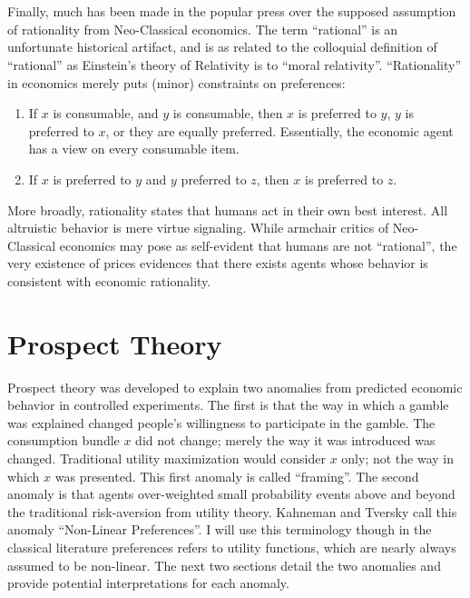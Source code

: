 \documentclass{article}
\theoremstyle{definition}
\begin{document}
\\
\\
Finally, much has been made in the popular press over the supposed assumption of rationality from Neo-Classical economics.  The term ``rational'' is an unfortunate historical artifact, and is as related to the colloquial definition of ``rational'' as Einstein's theory of Relativity is to ``moral relativity''.  ``Rationality'' in economics merely puts (minor) constraints on preferences: 
\begin{enumerate}
	\item If \(x\) is consumable, and \(y\) is consumable, then \(x\) is preferred to \(y\), \(y\) is preferred to \(x\), or they are equally preferred.  Essentially, the economic agent has a view on every consumable item.  
	\item If \(x\) is preferred to \(y\) and \(y\) preferred to \(z\), then \(x\) is preferred to \(z\).  
\end{enumerate}
More broadly, rationality states that humans act in their own best interest.  All altruistic behavior is mere virtue signaling. While armchair critics of Neo-Classical economics may pose as self-evident that humans are not ``rational'', the very existence of prices evidences that there exists agents whose behavior is consistent with economic rationality.   


\section{Prospect Theory}

Prospect theory was developed to explain two anomalies from predicted economic behavior in controlled experiments.  The first is that the way in which a gamble was explained changed people's willingness to participate in the gamble.  The consumption bundle \(x\) did not change; merely the way it was introduced was changed.  Traditional utility maximization would consider \(x\) only; not the way in which \(x\) was presented.  This first anomaly is called ``framing''.  The second anomaly is that agents over-weighted small probability events above and beyond the traditional risk-aversion from utility theory.  Kahneman and Tversky call this anomaly ``Non-Linear Preferences''.  I will use this terminology though in the classical literature preferences refers to utility functions, which are nearly always assumed to be non-linear. The next two sections detail the two anomalies and provide potential interpretations for each anomaly.  
\end{document}
